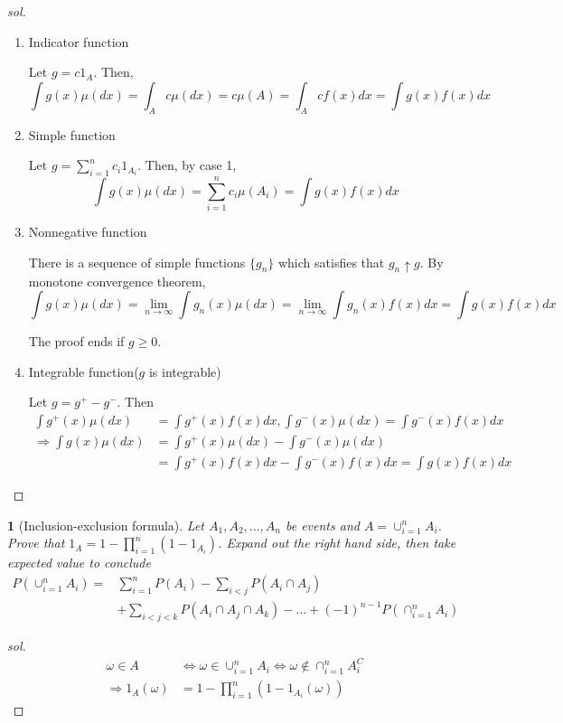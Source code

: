 \documentclass{report}
\newtheorem{ex}{}[section]
\begin{document}
\begin{proof}[sol]~
\begin{enumerate}
    \item Indicator function
    
    Let $g = c1_{A}$. Then,
    \[\int g(x)\mu(dx) = \int_A c\mu(dx) = c\mu(A) = \int_A cf(x)dx = \int g(x)f(x)dx\]
    \item Simple function
    
    Let $g = \sum_{i=1}^n c_i1_{A_i}$. Then, by case 1,
    \[\int g(x)\mu(dx) = \sum_{i=1}^n  c_i\mu(A_i) = \int g(x)f(x)dx\]
    \item Nonnegative function
    
    There is a sequence of simple functions $\{g_n\}$ which satisfies that $g_n \uparrow g$. By monotone convergence theorem,
    \[\int g(x)\mu(dx) = \lim_{n\to\infty} \int g_n(x)\mu(dx) = \lim_{n\to\infty} \int g_n(x)f(x)dx = \int g(x)f(x)dx\]
    
    The proof ends if $g \ge 0$.
    \item Integrable function($g$ is integrable)
    
    Let $g = g^+ - g^-$. Then
    \begin{align*}
        \int g^+(x)\mu(dx) &= \int g^+(x)f(x)dx, \int g^-(x)\mu(dx) = \int g^-(x)f(x)dx\\
        \Rightarrow \int g(x)\mu(dx) &=  \int g^+(x)\mu(dx) - \int g^-(x)\mu(dx)\\
        &=  \int g^+(x)f(x)dx - \int g^-(x)f(x)dx = \int g(x)f(x)dx
    \end{align*}
    
    
\end{enumerate}
\end{proof}
\begin{ex}[Inclusion-exclusion formula]
Let $A_1,A_2,...,A_n$ be events and $A = \cup_{i=1}^n A_i$. Prove that $1_A = 1 - \prod_{i=1}^n (1 - 1_{A_i})$. Expand out the right hand side, then take expected value to conclude
\begin{align*}
    P(\cup_{i=1}^n A_i) = &\sum_{i=1}^n P(A_i) - \sum_{i < j}P(A_i \cap A_j)\\
    &+ \sum_{i < j < k} P(A_i \cap A_j \cap A_k) - ... + (-1)^{n-1}P(\cap_{i=1}^n A_i)
\end{align*}
\end{ex}
\begin{proof}[sol]
\begin{align*}
    \omega \in A &\Leftrightarrow \omega \in \cup_{i=1}^n A_i \Leftrightarrow \omega \not\in \cap_{i=1}^n A_i^C\\
    \Rightarrow 1_A(\omega) &= 1 - \prod_{i=1}^n(1 - 1_{A_i}(\omega)) 
\end{align*}
\end{proof}
\end{document}
